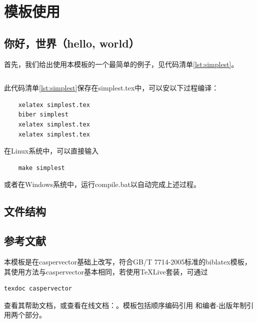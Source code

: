 \documentclass{LZU}
\newcommand{\filename}[1]{{\ttfamily #1}}
\newcommand{\package}[1]{{\sffamily #1}}
\begin{document}
\chapter{模板使用}
\section{你好，世界（hello, world）}
首先，我们给出使用本模板的一个最简单的例子，见代码清单\ref{lst:simplest}。

\begingroup
    \label{lst:simplest}
    \inputminted[breaklines,frame=single,linenos]{latex}{simplest.tex}
\endgroup
此代码清单\ref{lst:simplest}保存在\filename{simplest.tex}中，可以安以下过程编译：
\begin{verbatim}
    xelatex simplest.tex
    biber simplest
    xelatex simplest.tex
    xelatex simplest.tex
\end{verbatim}
在Linux系统中，可以直接输入
\begin{verbatim}
    make simplest
\end{verbatim}
或者在Windows系统中，运行\filename{compile.bat}以自动完成上述过程。

\section{文件结构}
\section{参考文献}
本模板是在caspervector\autocite{caspervector}基础上改写，符合GB/T 7714-2005标准\autocite{gbt7714-2005}的\package{biblatex}\autocite{biblatex}模板，其使用方法与caspervector基本相同，若使用TeXLive套装，可通过
\begin{verbatim}
texdoc caspervector
\end{verbatim}
查看其帮助文档，或查看在线文档：\cite[引用][]{caspervector}。模板包括顺序编码引用
和编者-出版年制引用两个部分。
\end{document}
